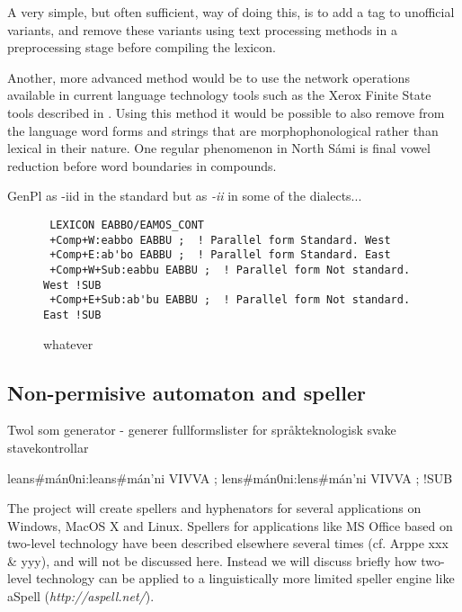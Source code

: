 \documentclass[a4paper,english]{article}
\begin{document}

A very simple, but often sufficient, way of doing this, is to add a tag to unofficial variants, and remove these variants using text processing methods in a preprocessing stage before compiling the lexicon.


Another, more advanced method would be to use the network operations available in current language technology tools such as the Xerox Finite State tools described in \cite{Beesley03}. Using this method it would be possible to also remove from the language word forms and strings that are morphophonological rather than lexical in their nature. One regular phenomenon in North Sámi is final vowel reduction before word boundaries in compounds.


GenPl as -iid in the standard but as \textit{-ii}
 in some of the dialects...

\begin{figure}[htbp]
\caption{whatever}
\begin{center}
\begin{verbatim}
 LEXICON EABBO/EAMOS_CONT
 +Comp+W:eabbo EABBU ;  ! Parallel form Standard. West
 +Comp+E:ab'bo EABBU ;  ! Parallel form Standard. East
 +Comp+W+Sub:eabbu EABBU ;  ! Parallel form Not standard. West !SUB
 +Comp+E+Sub:ab'bu EABBU ;  ! Parallel form Not standard. East !SUB
\end{verbatim}
\label{EWadjcomp}
\end{center}
\end{figure}

\subsection{Non-permisive automaton and speller}

Twol som generator - generer fullformslister for språkteknologisk svake stavekontrollar

leans\#mán0ni:leans\#mán'ni VIVVA ;
lens\#mán0ni:lens\#mán'ni VIVVA ; !SUB


The project will create spellers and hyphenators for several applications on Windows, MacOS X and Linux. Spellers for applications like MS Office based on two-level technology have been described elsewhere several times (cf. Arppe xxx \& yyy), and will not be discussed here. Instead we will discuss briefly how two-level technology can be applied to a linguistically more limited speller engine like aSpell (\textit{http://aspell.net/}).
\end{document}

